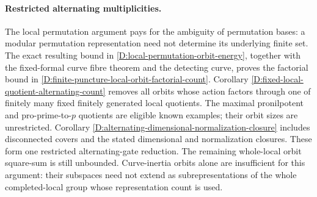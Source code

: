 \paragraph{Restricted alternating multiplicities.}
The local permutation argument pays for the ambiguity of permutation
bases: a modular permutation representation need not determine its
underlying finite set. The exact resulting bound in
\ref{D:local-permutation-orbit-energy}, together with the fixed-formal
curve fibre theorem and the detecting curve, proves the factorial
bound in \ref{D:finite-puncture-local-orbit-factorial-count}.
Corollary \ref{D:fixed-local-quotient-alternating-count} removes all
orbits whose action factors through one of finitely many fixed
finitely generated local quotients. The maximal pronilpotent and
pro-prime-to-$p$ quotients are eligible known examples; their orbit
sizes are unrestricted. Corollary
\ref{D:alternating-dimensional-normalization-closure} includes
disconnected covers and the stated dimensional and normalization
closures. These form one restricted alternating-gate reduction.
The remaining whole-local orbit square-sum is still unbounded.
Curve-inertia
orbits alone are insufficient for this argument: their subspaces
need not extend as subrepresentations of the whole completed-local
group whose representation count is used.
